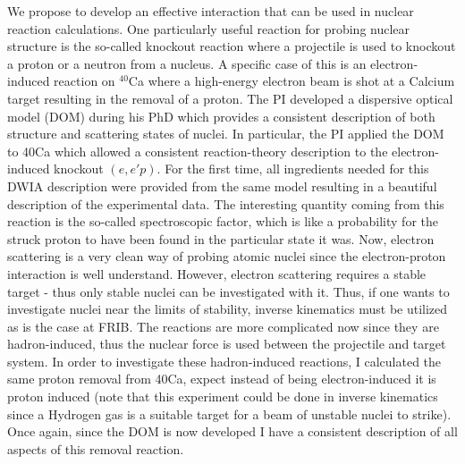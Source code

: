 \documentclass[12pt]{article}
\begin{document}
We propose to develop an effective interaction that can be used in nuclear reaction calculations. One particularly useful reaction for probing nuclear structure is
the so-called knockout reaction where a projectile is used to knockout a proton or a neutron from a nucleus. A specific case of this is an electron-induced reaction on $^{40}$Ca
where a high-energy electron beam is shot at a Calcium target resulting in the removal of a proton. The PI developed a dispersive optical model (DOM) during his PhD which provides
a consistent description of both structure and scattering states of nuclei. In particular, the PI applied the DOM to 40Ca which allowed a consistent reaction-theory description to
the electron-induced knockout $(e,e'p)$. For the first time, all ingredients needed for this DWIA description were provided from the same model resulting in a beautiful description
of the experimental data. The interesting quantity coming from this reaction is the so-called spectroscopic factor, which is like a probability for the struck proton to have been
found in the particular state it was. Now, electron scattering is a very clean way of probing atomic nuclei since the electron-proton interaction is well understand. However,
electron scattering requires a stable target - thus only stable nuclei can be investigated with it. Thus, if one wants to investigate nuclei near the limits of stability, inverse
kinematics must be utilized as is the case at FRIB. The reactions are more complicated now since they are hadron-induced, thus the nuclear force is used between the projectile and
target system. In order to investigate these hadron-induced reactions, I calculated the same proton removal from 40Ca, expect instead of being electron-induced it is proton induced
(note that this experiment could be done in inverse kinematics since a Hydrogen gas is a suitable target for a beam of unstable nuclei to strike). Once again, since the DOM is now
developed I have a consistent description of all aspects of this removal reaction.
\end{document}
